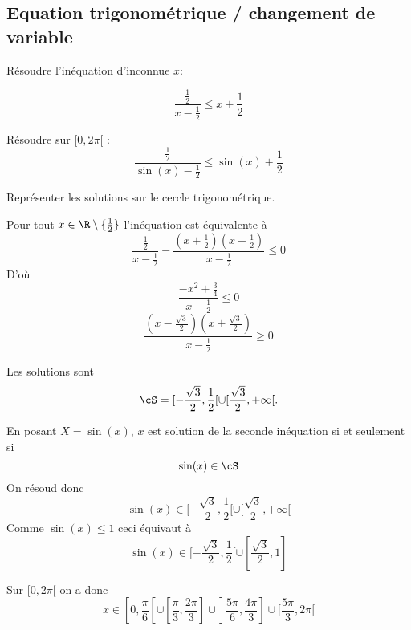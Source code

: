 \subsection{Equation trigonométrique / changement de variable}


\begin{exercice}
Résoudre l'inéquation d'inconnue $x$: 

$$\frac{\frac{1}{2}}{x-\frac{1}{2}}\leq x+\frac{1}{2}$$

Résoudre sur $[0,2\pi[$ :  
$$\frac{\frac{1}{2}}{\sin(x)-\frac{1}{2}}\leq \sin(x)+\frac{1}{2}$$

Représenter les solutions sur le cercle trigonométrique. 
\end{exercice}

\begin{correction}
Pour tout $x\in \R\setminus\{ \frac{1}{2}\}$ l'inéquation est équivalente à 
$$\frac{\frac{1}{2} }{x-\frac{1}{2}} - \frac{(x+\frac{1}{2})(x-\frac{1}{2})}{x-\frac{1}{2}}\leq 0$$
D'où
$$ \frac{-x^2 +\frac{3}{4}}{x-\frac{1}{2}}\leq 0$$
$$\frac{(x-\frac{\sqrt{3}}{2})(x+\frac{\sqrt{3}}{2})}{x-\frac{1}{2}}\geq 0$$

Les solutions sont 
$$\cS  = [-\frac{\sqrt{3}}{2}, \frac{1}{2}[\cup [\frac{\sqrt{3}}{2} , +\infty[.$$

En posant $X= \sin(x)$, $x$ est solution de la seconde inéquation si et seulement si 
$$\sin(x) \in \cS$$
On résoud donc 
$$\sin(x) \in   [-\frac{\sqrt{3}}{2}, \frac{1}{2}[\cup [\frac{\sqrt{3}}{2} , +\infty[$$
Comme $\sin(x)\leq 1$ ceci équivaut à 
$$\sin(x) \in  [-\frac{\sqrt{3}}{2}, \frac{1}{2}[\cup [\frac{\sqrt{3}}{2} , 1]$$

Sur $[0, 2\pi[ $ on a donc 
$$x \in [0, \frac{\pi}{6}[\cup [\frac{\pi}{3}, \frac{2\pi}{3}]\cup ]\frac{5\pi}{6}, 
\frac{4\pi}{3}]\cup [\frac{5\pi}{3}, 2\pi[$$

\end{correction}